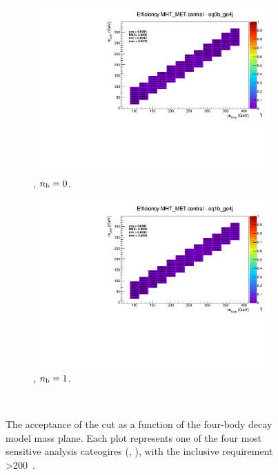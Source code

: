 \begin{figure}[h!]
\begin{subfigure}[b]{0.4\textwidth}
    \includegraphics[width=\textwidth, page=6]{Figs/sms/t2degen/v19_3/systs/T2_4body_MHT_MET_eq0b_ge4j.pdf}
    \caption{\njhigh, $n_{\text{b}} = 0$.}
  \end{subfigure}
  \begin{subfigure}[b]{0.4\textwidth}
    \includegraphics[width=\textwidth, page=6]{Figs/sms/t2degen/v19_3/systs/T2_4body_MHT_MET_eq1b_ge4j.pdf}
    \caption{\njhigh, $n_{\text{b}} = 1$.}
  \end{subfigure}\\
  \caption{The acceptance of the \mhtmet cut as a function of the four-body
  decay model
  mass plane. Each plot represents one of the four most sensitive 
  analysis cateogires (\nb, \nj), with the inclusive requirement \HT>200~\gev.}
  \label{fig:sms-mhtmet-t2degen}
\end{figure}



